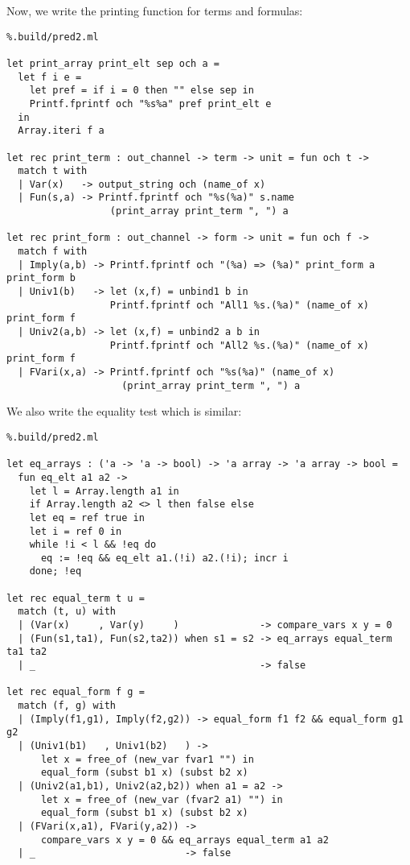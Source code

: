 \documentclass[11pt]{article}
\begin{document}
Now, we write the printing function for terms and formulas:

\begin{lstlisting}%.build/pred2.ml

let print_array print_elt sep och a =
  let f i e =
    let pref = if i = 0 then "" else sep in
    Printf.fprintf och "%s%a" pref print_elt e
  in
  Array.iteri f a

let rec print_term : out_channel -> term -> unit = fun och t ->
  match t with
  | Var(x)   -> output_string och (name_of x)
  | Fun(s,a) -> Printf.fprintf och "%s(%a)" s.name
                  (print_array print_term ", ") a

let rec print_form : out_channel -> form -> unit = fun och f ->
  match f with
  | Imply(a,b) -> Printf.fprintf och "(%a) => (%a)" print_form a print_form b
  | Univ1(b)   -> let (x,f) = unbind1 b in
                  Printf.fprintf och "All1 %s.(%a)" (name_of x) print_form f
  | Univ2(a,b) -> let (x,f) = unbind2 a b in
                  Printf.fprintf och "All2 %s.(%a)" (name_of x) print_form f
  | FVari(x,a) -> Printf.fprintf och "%s(%a)" (name_of x)
                    (print_array print_term ", ") a
\end{lstlisting}

We also write the equality test which is similar:
\begin{lstlisting}%.build/pred2.ml

let eq_arrays : ('a -> 'a -> bool) -> 'a array -> 'a array -> bool =
  fun eq_elt a1 a2 ->
    let l = Array.length a1 in
    if Array.length a2 <> l then false else
    let eq = ref true in
    let i = ref 0 in
    while !i < l && !eq do
      eq := !eq && eq_elt a1.(!i) a2.(!i); incr i
    done; !eq

let rec equal_term t u =
  match (t, u) with
  | (Var(x)     , Var(y)     )              -> compare_vars x y = 0
  | (Fun(s1,ta1), Fun(s2,ta2)) when s1 = s2 -> eq_arrays equal_term ta1 ta2
  | _                                       -> false

let rec equal_form f g =
  match (f, g) with
  | (Imply(f1,g1), Imply(f2,g2)) -> equal_form f1 f2 && equal_form g1 g2
  | (Univ1(b1)   , Univ1(b2)   ) ->
      let x = free_of (new_var fvar1 "") in
      equal_form (subst b1 x) (subst b2 x)
  | (Univ2(a1,b1), Univ2(a2,b2)) when a1 = a2 ->
      let x = free_of (new_var (fvar2 a1) "") in
      equal_form (subst b1 x) (subst b2 x)
  | (FVari(x,a1), FVari(y,a2)) ->
      compare_vars x y = 0 && eq_arrays equal_term a1 a2
  | _                          -> false
\end{lstlisting}
\end{document}
